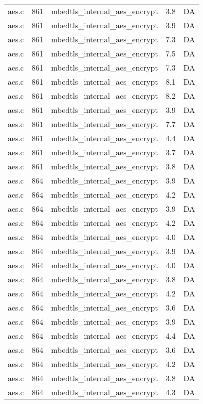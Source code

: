 \begin{table}[!ht]
\begin{tabular}{lrlrr}
aes.c& 861&mbedtls\_internal\_aes\_encrypt&3.8 &DA\\
aes.c& 861&mbedtls\_internal\_aes\_encrypt&3.9 &DA\\
aes.c& 861&mbedtls\_internal\_aes\_encrypt&7.3 &DA\\
aes.c& 861&mbedtls\_internal\_aes\_encrypt&7.5 &DA\\
aes.c& 861&mbedtls\_internal\_aes\_encrypt&7.3 &DA\\
aes.c& 861&mbedtls\_internal\_aes\_encrypt&8.1 &DA\\
aes.c& 861&mbedtls\_internal\_aes\_encrypt&8.2 &DA\\
aes.c& 861&mbedtls\_internal\_aes\_encrypt&3.9 &DA\\
aes.c& 861&mbedtls\_internal\_aes\_encrypt&7.7 &DA\\
aes.c& 861&mbedtls\_internal\_aes\_encrypt&4.4 &DA\\
aes.c& 861&mbedtls\_internal\_aes\_encrypt&3.7 &DA\\
aes.c& 861&mbedtls\_internal\_aes\_encrypt&3.8 &DA\\
aes.c& 864&mbedtls\_internal\_aes\_encrypt&3.9 &DA\\
aes.c& 864&mbedtls\_internal\_aes\_encrypt&4.2 &DA\\
aes.c& 864&mbedtls\_internal\_aes\_encrypt&3.9 &DA\\
aes.c& 864&mbedtls\_internal\_aes\_encrypt&4.2 &DA\\
aes.c& 864&mbedtls\_internal\_aes\_encrypt&4.0 &DA\\
aes.c& 864&mbedtls\_internal\_aes\_encrypt&3.9 &DA\\
aes.c& 864&mbedtls\_internal\_aes\_encrypt&4.0 &DA\\
aes.c& 864&mbedtls\_internal\_aes\_encrypt&3.8 &DA\\
aes.c& 864&mbedtls\_internal\_aes\_encrypt&4.2 &DA\\
aes.c& 864&mbedtls\_internal\_aes\_encrypt&3.6 &DA\\
aes.c& 864&mbedtls\_internal\_aes\_encrypt&3.9 &DA\\
aes.c& 864&mbedtls\_internal\_aes\_encrypt&4.4 &DA\\
aes.c& 864&mbedtls\_internal\_aes\_encrypt&3.6 &DA\\
aes.c& 864&mbedtls\_internal\_aes\_encrypt&4.2 &DA\\
aes.c& 864&mbedtls\_internal\_aes\_encrypt&3.8 &DA\\
aes.c& 864&mbedtls\_internal\_aes\_encrypt&4.3 &DA\\

\end{tabular}
\end{table}
